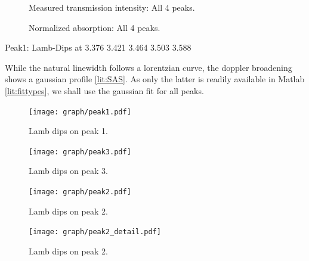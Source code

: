 \begin{figure}[h]
	\centering
	
	\vspace{-1ex}
	\caption{Measured transmission intensity: All 4 peaks.}
	\label{fig:saturation}
	\vspace{2ex}
	
	\vspace{-1ex}
	\caption{Normalized absorption: All 4 peaks.}
	\label{fig:spectrum}
\end{figure}





Peak1: Lamb-Dips at
3.376
3.421
3.464
3.503
3.588


While the natural linewidth follows a lorentzian curve, the doppler broadening shows a gaussian profile \ref{lit:SAS}. As only the latter is readily available in Matlab \ref{lit:fittypes}, we shall use the gaussian fit for all peaks.









\begin{figure}[p]
	\centering
	\texttt{[image: graph/peak1.pdf]}
	\vspace{-2ex}
	\caption{Lamb dips on peak 1.}
	\label{fig:P1}
	\vspace{2ex}

	\texttt{[image: graph/peak3.pdf]}
	\vspace{-2ex}
	\caption{Lamb dips on peak 3.}
	\label{fig:P3}
	\vspace{-2em}
\end{figure}

\begin{figure}[p]
	\centering
	\texttt{[image: graph/peak2.pdf]}
	\vspace{-2ex}
	\caption{Lamb dips on peak 2.}
	\label{fig:P2f}
	\vspace{2ex}

	\texttt{[image: graph/peak2\_detail.pdf]}
	\vspace{-2ex}
	\caption{Lamb dips on peak 2.}
	\label{fig:P2}
	\vspace{-2em}
\end{figure}

